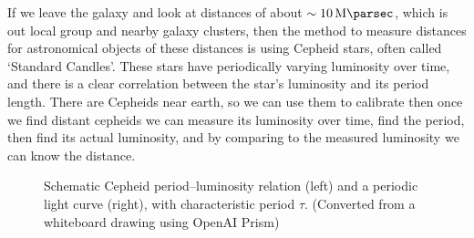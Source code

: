 If we leave the galaxy and look at distances of about \(\sim\qty{10}{\mega\parsec}\), which is out local group and nearby galaxy clusters, then the method to measure distances for astronomical objects of these distances is using Cepheid stars, often called `Standard Candles'. These stars have periodically varying luminosity over time, and there is a clear correlation between the star's luminosity and its period length. There are Cepheids near earth, so we can use them to calibrate then once we find distant cepheids we can measure its luminosity over time, find the period, then find its actual luminosity, and by comparing to the measured luminosity we can know the distance.
\begin{figure}[!htb]
  \centering
  \caption{Schematic Cepheid period--luminosity relation (left) and a periodic light curve (right), with characteristic period $\tau$. (Converted from a whiteboard drawing using OpenAI Prism)}
\end{figure}

